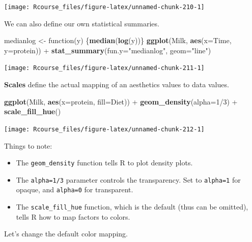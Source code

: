 \documentclass[]{book}
\newenvironment{Shaded}{\begin{snugshade}}{\end{snugshade}}
\newcommand{\KeywordTok}[1]{\textcolor[rgb]{0.13,0.29,0.53}{\textbf{{#1}}}}
\newcommand{\DataTypeTok}[1]{\textcolor[rgb]{0.13,0.29,0.53}{{#1}}}
\newcommand{\DecValTok}[1]{\textcolor[rgb]{0.00,0.00,0.81}{{#1}}}
\newcommand{\StringTok}[1]{\textcolor[rgb]{0.31,0.60,0.02}{{#1}}}
\newcommand{\NormalTok}[1]{{#1}}
\providecommand{\tightlist}{%
  \setlength{\itemsep}{0pt}\setlength{\parskip}{0pt}}
\theoremstyle{definition}
\theoremstyle{definition}
\theoremstyle{remark}
\begin{document}
\texttt{[image: Rcourse\_files/figure-latex/unnamed-chunk-210-1]}

We can also define our own statistical summaries.

\begin{Shaded}
\begin{Highlighting}[]
\NormalTok{medianlog <-}\StringTok{ }\NormalTok{function(y) \{}\KeywordTok{median}\NormalTok{(}\KeywordTok{log}\NormalTok{(y))\}}
\KeywordTok{ggplot}\NormalTok{(Milk, }\KeywordTok{aes}\NormalTok{(}\DataTypeTok{x=}\NormalTok{Time, }\DataTypeTok{y=}\NormalTok{protein)) +}
\StringTok{  }\KeywordTok{stat_summary}\NormalTok{(}\DataTypeTok{fun.y=}\StringTok{"medianlog"}\NormalTok{, }\DataTypeTok{geom=}\StringTok{"line"}\NormalTok{)}
\end{Highlighting}
\end{Shaded}

\texttt{[image: Rcourse\_files/figure-latex/unnamed-chunk-211-1]}

\textbf{Scales} define the actual mapping of an aesthetics values to
data values.

\begin{Shaded}
\begin{Highlighting}[]
\KeywordTok{ggplot}\NormalTok{(Milk, }\KeywordTok{aes}\NormalTok{(}\DataTypeTok{x=}\NormalTok{protein, }\DataTypeTok{fill=}\NormalTok{Diet)) +}
\StringTok{  }\KeywordTok{geom_density}\NormalTok{(}\DataTypeTok{alpha=}\DecValTok{1}\NormalTok{/}\DecValTok{3}\NormalTok{) +}
\StringTok{  }\KeywordTok{scale_fill_hue}\NormalTok{()}
\end{Highlighting}
\end{Shaded}

\texttt{[image: Rcourse\_files/figure-latex/unnamed-chunk-212-1]}

Things to note:

\begin{itemize}
\tightlist
\item
  The \texttt{geom\_density} function tells R to plot density plots.
\item
  The \texttt{alpha=1/3} parameter controls the transparency. Set to
  \texttt{alpha=1} for opaque, and \texttt{alpha=0} for transparent.
\item
  The \texttt{scale\_fill\_hue} function, which is the default (thus can
  be omitted), tells R how to map factors to colors.
\end{itemize}

Let's change the default color mapping.
\end{document}
